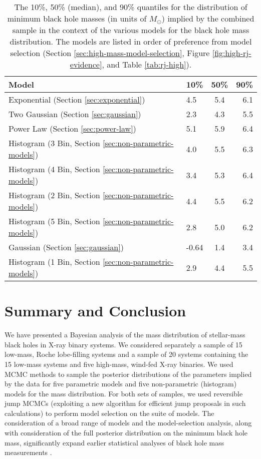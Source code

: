 \documentclass[preprint]{aastex}
\newcommand{\Msun}{M_\odot}
\begin{document}
\begin{table}
  \begin{center}
    \begin{tabular}{|l|l|c|r|}
      \hline
      Model & 10\% & 50\% & 90\% \\
      \hline \hline
      Exponential (Section \ref{sec:exponential}) & 4.5 & 5.4 & 6.1 \\
      \hline
      Two Gaussian (Section \ref{sec:gaussian}) & 2.3 & 4.3 & 5.5 \\
      \hline
      Power Law (Section \ref{sec:power-law}) & 5.1 & 5.9 & 6.4 \\
      \hline
      Histogram (3 Bin, Section \ref{sec:non-parametric-models}) & 4.0 & 5.5 & 6.3 \\
      \hline 
      Histogram (4 Bin, Section \ref{sec:non-parametric-models}) & 3.4 & 5.3 & 6.4 \\
      \hline
      Histogram (2 Bin, Section \ref{sec:non-parametric-models}) & 4.4 & 5.5 & 6.2 \\
      \hline
      Histogram (5 Bin, Section \ref{sec:non-parametric-models}) & 2.8 & 5.0 & 6.2 \\
      \hline
      Gaussian (Section \ref{sec:gaussian}) & -0.64 & 1.4 & 3.4 \\
      \hline 
      Histogram (1 Bin, Section \ref{sec:non-parametric-models}) & 2.9 & 4.4 & 5.5 \\
      \hline
    \end{tabular}
  \end{center}
  \caption{\label{tab:mmin-quants-high} The 10\%, 50\% (median), and 90\% quantiles for the distribution of minimum black hole masses (in units of $\Msun$) implied by the combined sample in the context of the various models for the black hole mass distribution.  The models are listed in order of preference from model selection (Section \ref{sec:high-mass-model-selection}, Figure \ref{fig:high-rj-evidence}, and Table \ref{tab:rj-high}). }
\end{table}

\section{Summary and Conclusion}
\label{sec:conclusion}

We have presented a Bayesian analysis of the mass distribution of
stellar-mass black holes in X-ray binary systems.  We considered
separately a sample of 15 low-mass, Roche lobe-filling systems and a
sample of 20 systems containing the 15 low-mass systems and five
high-mass, wind-fed X-ray binaries.  We used MCMC methods to sample
the posterior distributions of the parameters implied by the data for
five parametric models and five non-parametric (histogram) models for
the mass distribution.  For both sets of samples, we used reversible
jump MCMCs (exploiting a new algorithm for efficient jump proposals in
such calculations) to perform model selection on the suite of models.
The consideration of a broad range of models and the model-selection
analysis, along with consideration of the full posterior distribution
on the minimum black hole mass, significantly expand earlier
statistical analyses of black hole mass measurements
\citep{Bailyn1998,Ozel2010}.
\end{document}
